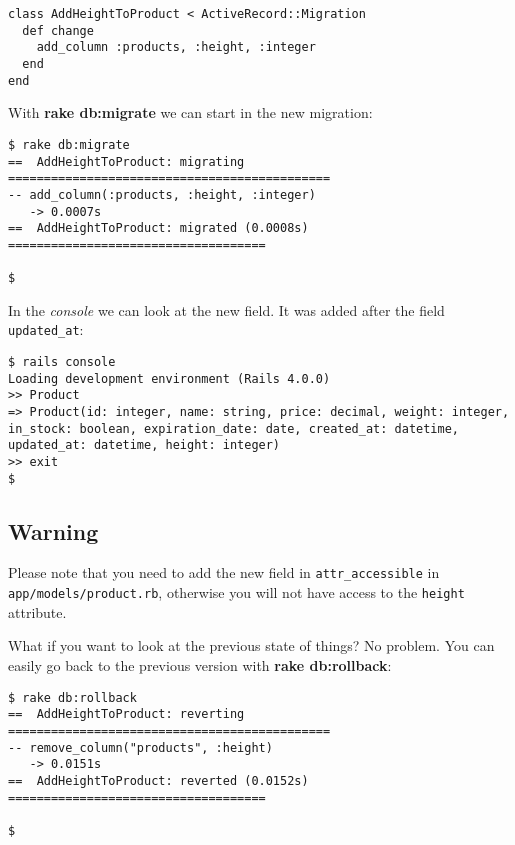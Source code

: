 \documentclass[a4paper]{book}
\begin{document}
\begin{shaded}\begin{verbatim}
class AddHeightToProduct < ActiveRecord::Migration
  def change
    add_column :products, :height, :integer
  end
end
\end{verbatim}\end{shaded}

With \textbf{rake db:migrate} we can start in the new migration:

\begin{shaded}\begin{verbatim}
$ rake db:migrate
==  AddHeightToProduct: migrating =============================================
-- add_column(:products, :height, :integer)
   -> 0.0007s
==  AddHeightToProduct: migrated (0.0008s) ====================================

$
\end{verbatim}\end{shaded}

In the \emph{console} we can look at the new field. It was added after the field \texttt{updated\_at}:

\begin{shaded}\begin{verbatim}
$ rails console
Loading development environment (Rails 4.0.0)
>> Product
=> Product(id: integer, name: string, price: decimal, weight: integer, in_stock: boolean, expiration_date: date, created_at: datetime, updated_at: datetime, height: integer)
>> exit
$
\end{verbatim}\end{shaded}

\subsection{Warning}\label{warning-9}

Please note that you need to add the new field in \texttt{attr\_accessible} in \texttt{app/models/product.rb}, otherwise you will not have access to the \texttt{height} attribute.

What if you want to look at the previous state of things? No problem. You can easily go back to the previous version with \textbf{rake db:rollback}:

\begin{shaded}\begin{verbatim}
$ rake db:rollback
==  AddHeightToProduct: reverting =============================================
-- remove_column("products", :height)
   -> 0.0151s
==  AddHeightToProduct: reverted (0.0152s) ====================================

$
\end{verbatim}\end{shaded}
\end{document}
